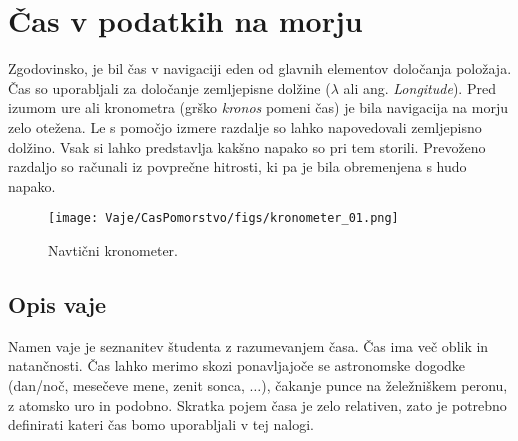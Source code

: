 %
\chapter{Čas v podatkih na morju}
\label{sec:v_cas} 

Zgodovinsko, je bil čas v navigaciji eden od glavnih elementov določanja položaja. Čas so uporabljali za določanje zemljepisne dolžine ($\lambda$ ali ang. \emph{Longitude}). Pred izumom ure ali  kronometra (grško \emph{kronos} pomeni čas) je bila navigacija na morju zelo otežena. Le s pomočjo izmere razdalje so lahko napovedovali zemljepisno dolžino. Vsak si lahko predstavlja kakšno napako so pri tem storili. Prevoženo razdaljo so računali iz povprečne hitrosti, ki pa je bila obremenjena s hudo napako.

\begin{figure}[!h]
	\centering \texttt{[image: Vaje/CasPomorstvo/figs/kronometer\_01.png]}
	\caption{Navtični kronometer.}
\end{figure}

\section{Opis vaje}
\label{sec:v_cas_opis}
Namen vaje je seznanitev študenta z razumevanjem časa. Čas ima več oblik in natančnosti. Čas lahko merimo skozi ponavljajoče se astronomske dogodke (dan/noč, mesečeve mene, zenit sonca, $\ldots$), čakanje punce na želežniškem peronu, z atomsko uro in podobno. Skratka pojem časa je zelo relativen, zato je potrebno definirati kateri čas bomo uporabljali v tej nalogi.

